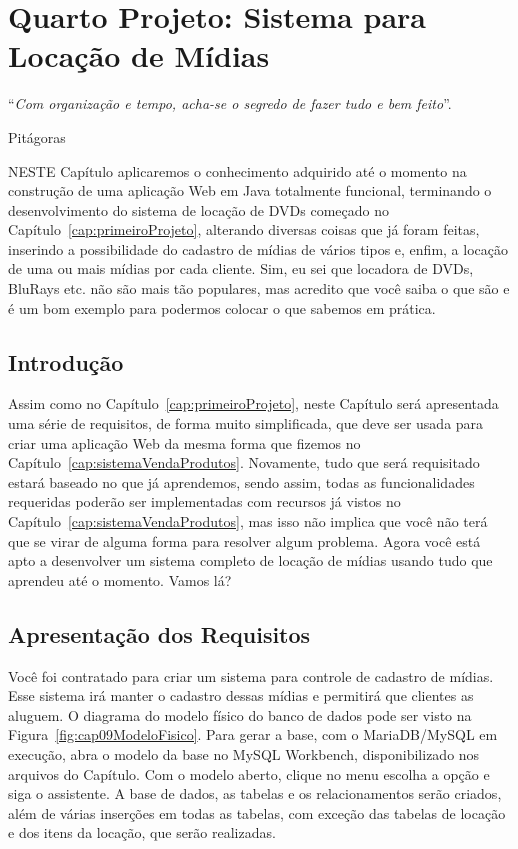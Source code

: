 \chapter{Quarto Projeto: Sistema para Locação de Mídias}\label{cap:segundoProjeto}
\epigraph{``\textit{Com organização e tempo, acha-se o segredo de fazer tudo e bem feito}''.}{Pitágoras}

\lettrine[lines=4, lhang=0.1, lraise=0, loversize=0.2, findent=0.1em]{\textcolor{corTema}{N}}{ESTE} Capítulo aplicaremos o conhecimento adquirido até o momento na construção de uma aplicação Web em Java totalmente funcional, terminando o desenvolvimento do sistema de locação de DVDs começado no Capítulo~\ref{cap:primeiroProjeto}, alterando diversas coisas que já foram feitas, inserindo a possibilidade do cadastro de mídias de vários tipos e, enfim, a locação de uma ou mais mídias por cada cliente. Sim, eu sei que locadora de DVDs, BluRays etc. não são mais tão populares, mas acredito que você saiba o que são e é um bom exemplo para podermos colocar o que sabemos em prática.


\section{Introdução}

Assim como no Capítulo~\ref{cap:primeiroProjeto}, neste Capítulo será apresentada uma série de requisitos, de forma muito simplificada, que deve ser usada para criar uma aplicação Web da mesma forma que fizemos no Capítulo~\ref{cap:sistemaVendaProdutos}. Novamente, tudo que será requisitado estará baseado no que já aprendemos, sendo assim, todas as funcionalidades requeridas poderão ser implementadas com recursos já vistos no Capítulo~\ref{cap:sistemaVendaProdutos}, mas isso não implica que você não terá que se virar de alguma forma para resolver algum problema. Agora você está apto a desenvolver um sistema completo de locação de mídias usando tudo que aprendeu até o momento. Vamos lá?


\section{Apresentação dos Requisitos}

Você foi contratado para criar um sistema para controle de cadastro de mídias. Esse sistema irá manter o cadastro dessas mídias e permitirá que clientes as aluguem. O diagrama do modelo físico do banco de dados pode ser visto na Figura~\ref{fig:cap09ModeloFisico}. Para gerar a base, com o MariaDB/MySQL em execução, abra o modelo da base no MySQL Workbench, disponibilizado nos arquivos do Capítulo. Com o modelo aberto, clique no menu  escolha a opção  e siga o assistente. A base de dados, as tabelas e os relacionamentos serão criados, além de várias inserções em todas as tabelas, com exceção das tabelas de locação e dos itens da locação, que serão realizadas.

